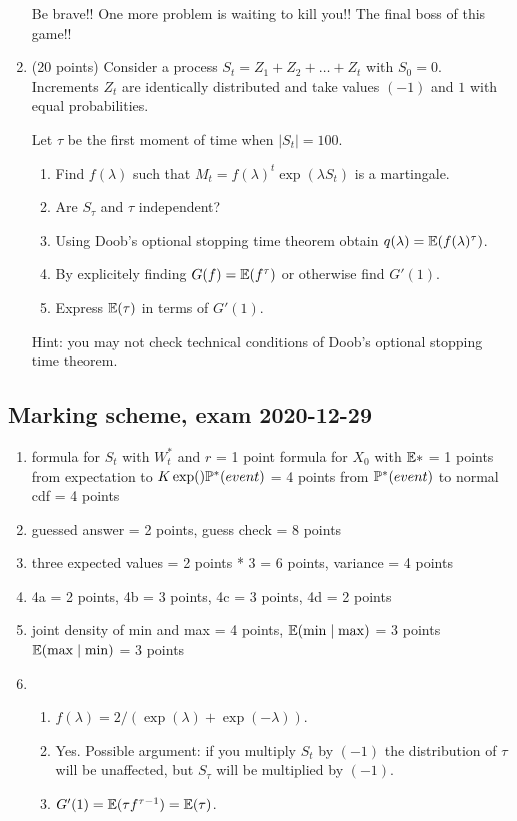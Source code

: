 \documentclass[12pt, a4paper]{article}
\begin{document}
\begin{enumerate}
    Be brave!! One more problem is waiting to kill you!! The final boss of this game!!

    \item (20 points) Consider a process $S_t = Z_1 + Z_2 + \ldots + Z_t$ with $S_0=0$.
    Increments $Z_t$ are identically distributed and take values $(-1)$ and $1$ 
    with equal probabilities. 

    Let $\tau$ be the first moment of time when $|S_t| = 100$.

    \begin{enumerate}
        \item Find $f(\lambda)$ such that $M_t = f(\lambda)^t\exp(\lambda S_t)$ is a martingale.
        \item Are $S_{\tau}$ and $\tau$ independent?
        \item Using Doob's optional stopping time theorem obtain $q(\lambda) = \E(f(\lambda)^{\tau})$.
        \item By explicitely finding $G(f) = \E(f^{\tau})$ or otherwise find $G'(1)$.
        \item Express $\E(\tau)$ in terms of $G'(1)$.
    \end{enumerate}

    Hint: you may not check technical conditions of Doob's optional stopping time theorem.
    
\end{enumerate}



\subsection{Marking scheme, exam 2020-12-29}


\begin{enumerate}
  \item formula for $S_t$ with $W_t^*$ and $r$ = 1 point
  formula for $X_0$ with $\E*$ = 1 points
  from expectation to $K\exp()\P^*(event)$ =  4 points
  from $\P^*(event)$ to normal cdf = 4 points
\item  guessed answer = 2 points, guess check = 8 points
\item three expected values = 2 points * 3 = 6 points, variance = 4 points
\item 4a = 2 points, 4b = 3 points, 4c = 3 points, 4d = 2 points

\item joint density of min and max = 4 points,
$\E(\min\mid \max)$ = 3 points
$\E(\max\mid \min)$ = 3 points 

\item \begin{enumerate}
  \item $f(\lambda) = 2/(\exp(\lambda) + \exp(-\lambda))$.
  \item Yes. Possible argument: if you multiply $S_t$ by $(-1)$ the distribution of $\tau$ will be unaffected, 
  but $S_{\tau}$ will be multiplied by $(-1)$. 
  \item $G'(1) = \E(\tau f^{\tau-1}) = \E(\tau)$.
\end{enumerate}
\end{enumerate}
\end{document}
